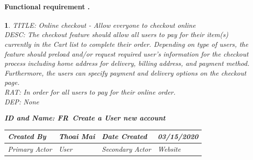 \documentclass{scrreprt}
\theoremstyle{funreq}
\newtheorem{funreq}{}
\begin{document}
	\paragraph[]{Functional requirement .}
	\begin{funreq}
		\label{online_checkout}
		TITLE: Online checkout - Allow everyone to checkout online\\
		DESC: The checkout feature should allow all users to pay for their item(s) currently in the Cart list to complete their order. Depending on type of users, the feature should preload and/or request required user’s information for the checkout process including home address for delivery, billing address, and payment method. Furthermore, the users can specify payment and delivery options on the checkout page.\\
		RAT: In order for all users to pay for their online order.\\
		DEP: None\\
		
		\clearpage
		\begin{table}[htb]
			\begin{flushleft}\bfseries{ID and Name: FR\thefunreq ~\hspace{.6cm}Create a User new account}\end{flushleft}
			\begin{tabularx}{\columnwidth}{|X|X|X|X|}
				\hline
				Created By    & Thoai Mai & Date Created    & 03/15/2020 \\ \hline
				Primary Actor & User        & Secondary Actor & Website \\ \hline
			\end{tabularx}
		
\end{table}
\end{funreq}
\end{document}
